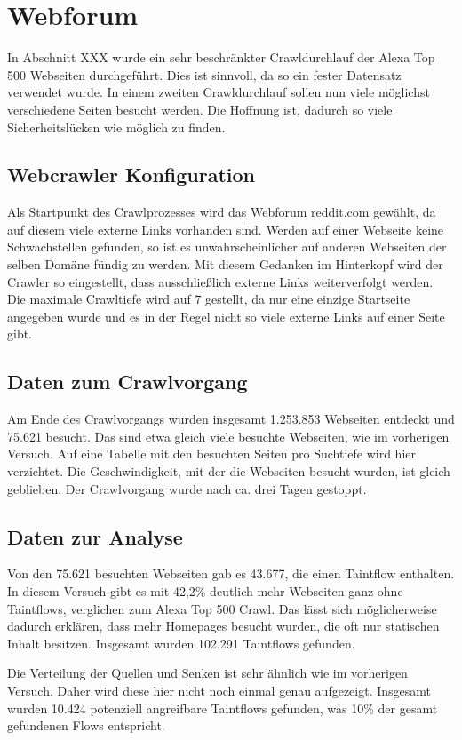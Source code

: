 \section{Webforum}
In Abschnitt XXX wurde ein sehr beschränkter Crawldurchlauf der Alexa Top 500 Webseiten durchgeführt. Dies ist sinnvoll, da so ein fester Datensatz verwendet wurde. In einem zweiten Crawldurchlauf sollen nun viele möglichst verschiedene Seiten besucht werden. Die Hoffnung ist, dadurch so viele Sicherheitslücken wie möglich zu finden.
\subsection{Webcrawler Konfiguration}
Als Startpunkt des Crawlprozesses wird das Webforum reddit.com gewählt, da auf diesem viele externe Links vorhanden sind. Werden auf einer Webseite keine Schwachstellen gefunden, so ist es unwahrscheinlicher auf anderen Webseiten der selben Domäne fündig zu werden. Mit diesem Gedanken im Hinterkopf wird der Crawler so eingestellt, dass ausschließlich externe Links weiterverfolgt werden. \\
Die maximale Crawltiefe wird auf 7 gestellt, da nur eine einzige Startseite angegeben wurde und es in der Regel nicht so viele externe Links auf einer Seite gibt.
\subsection{Daten zum Crawlvorgang}
Am Ende des Crawlvorgangs wurden insgesamt 1.253.853 Webseiten entdeckt und 75.621 besucht. Das sind etwa gleich viele besuchte Webseiten, wie im vorherigen Versuch. Auf eine Tabelle mit den besuchten Seiten pro Suchtiefe wird hier verzichtet. Die Geschwindigkeit, mit der die Webseiten besucht wurden, ist gleich geblieben. Der Crawlvorgang wurde nach ca. drei Tagen gestoppt.
\subsection{Daten zur Analyse}
Von den 75.621 besuchten Webseiten gab es 43.677, die einen Taintflow enthalten. In diesem Versuch gibt es mit  42,2\% deutlich mehr Webseiten ganz ohne Taintflows, verglichen zum Alexa Top 500 Crawl. Das lässt sich möglicherweise dadurch erklären, dass mehr Homepages besucht wurden, die oft nur statischen Inhalt besitzen. Insgesamt wurden 102.291 Taintflows gefunden.

Die Verteilung der Quellen und Senken ist sehr ähnlich wie im vorherigen Versuch. Daher wird diese hier nicht noch einmal genau aufgezeigt. Insgesamt wurden 10.424 potenziell angreifbare Taintflows gefunden, was 10\% der gesamt gefundenen Flows entspricht.

